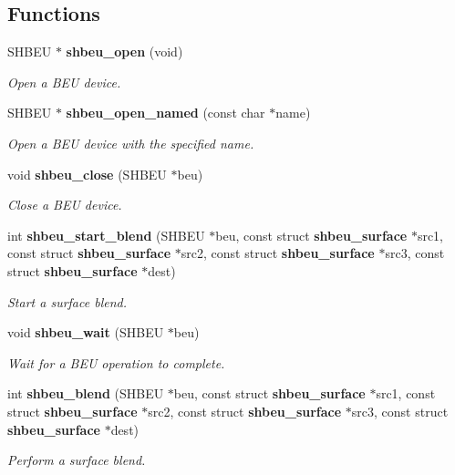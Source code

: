 \subsection*{Functions}
\begin{DoxyCompactItemize}
\item 
SHBEU $\ast$ {\bf shbeu\_\-open} (void)
\begin{DoxyCompactList}\small\item\em Open a BEU device. \item\end{DoxyCompactList}\item 
SHBEU $\ast$ {\bf shbeu\_\-open\_\-named} (const char $\ast$name)
\begin{DoxyCompactList}\small\item\em Open a BEU device with the specified name. \item\end{DoxyCompactList}\item 
void {\bf shbeu\_\-close} (SHBEU $\ast$beu)
\begin{DoxyCompactList}\small\item\em Close a BEU device. \item\end{DoxyCompactList}\item 
int {\bf shbeu\_\-start\_\-blend} (SHBEU $\ast$beu, const struct {\bf shbeu\_\-surface} $\ast$src1, const struct {\bf shbeu\_\-surface} $\ast$src2, const struct {\bf shbeu\_\-surface} $\ast$src3, const struct {\bf shbeu\_\-surface} $\ast$dest)
\begin{DoxyCompactList}\small\item\em Start a surface blend. \item\end{DoxyCompactList}\item 
void {\bf shbeu\_\-wait} (SHBEU $\ast$beu)
\begin{DoxyCompactList}\small\item\em Wait for a BEU operation to complete. \item\end{DoxyCompactList}\item 
int {\bf shbeu\_\-blend} (SHBEU $\ast$beu, const struct {\bf shbeu\_\-surface} $\ast$src1, const struct {\bf shbeu\_\-surface} $\ast$src2, const struct {\bf shbeu\_\-surface} $\ast$src3, const struct {\bf shbeu\_\-surface} $\ast$dest)
\begin{DoxyCompactList}\small\item\em Perform a surface blend. \item\end{DoxyCompactList}\end{DoxyCompactItemize}


